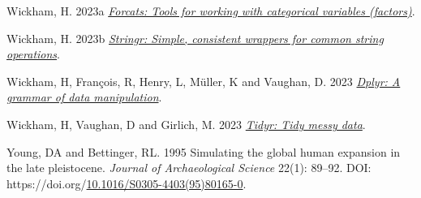 \documentclass[
]{article}
\newlength{\cslhangindent}
\newlength{\cslentryspacingunit} %
\newenvironment{CSLReferences}[2] %
 {%
  \setlength{\parindent}{0pt}
  \ifodd #1
  \let\oldpar\par
  \def\par{\hangindent=\cslhangindent\oldpar}
  \fi
  \setlength{\parskip}{#2\cslentryspacingunit}
 }%
 {}
\begin{document}
\begin{CSLReferences}{1}{0}
\leavevmode{}%
Wickham, H. 2023a \emph{\href{https://forcats.tidyverse.org/}{Forcats: Tools for working with categorical variables (factors)}}.

\leavevmode{}%
Wickham, H. 2023b \emph{\href{https://stringr.tidyverse.org}{Stringr: Simple, consistent wrappers for common string operations}}.

\leavevmode{}%
Wickham, H, François, R, Henry, L, Müller, K and Vaughan, D. 2023 \emph{\href{https://dplyr.tidyverse.org}{Dplyr: A grammar of data manipulation}}.

\leavevmode{}%
Wickham, H, Vaughan, D and Girlich, M. 2023 \emph{\href{https://tidyr.tidyverse.org}{Tidyr: Tidy messy data}}.

\leavevmode{}%
Young, DA and Bettinger, RL. 1995 Simulating the global human expansion in the late pleistocene. \emph{Journal of Archaeological Science} 22(1): 89--92. DOI: https://doi.org/\href{https://doi.org/10.1016/S0305-4403(95)80165-0}{10.1016/S0305-4403(95)80165-0}.

\end{CSLReferences}
\end{document}
